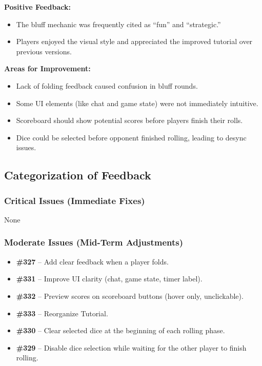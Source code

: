 \documentclass[12pt, titlepage]{article}
\begin{document}
\textbf{Positive Feedback:}
\begin{itemize}
    \item The bluff mechanic was frequently cited as “fun” and “strategic.”
    \item Players enjoyed the visual style and appreciated the improved tutorial over previous versions.
\end{itemize}

\textbf{Areas for Improvement:}
\begin{itemize}
    \item Lack of folding feedback caused confusion in bluff rounds.
    \item Some UI elements (like chat and game state) were not immediately intuitive.
    \item Scoreboard should show potential scores before players finish their rolls.
    \item Dice could be selected before opponent finished rolling, leading to desync issues.
\end{itemize}


\subsection{Categorization of Feedback}

\subsubsection{Critical Issues (Immediate Fixes)}
None

\subsubsection{Moderate Issues (Mid-Term Adjustments)}
\begin{itemize}
    \item \textbf{\#327} – Add clear feedback when a player folds.
    \item \textbf{\#331} – Improve UI clarity (chat, game state, timer label).
    \item \textbf{\#332} – Preview scores on scoreboard buttons (hover only, unclickable).
    \item \textbf{\#333} – Reorganize Tutorial.
    \item \textbf{\#330} – Clear selected dice at the beginning of each rolling phase.
    \item \textbf{\#329} – Disable dice selection while waiting for the other player to finish rolling.
\end{itemize}
\end{document}
